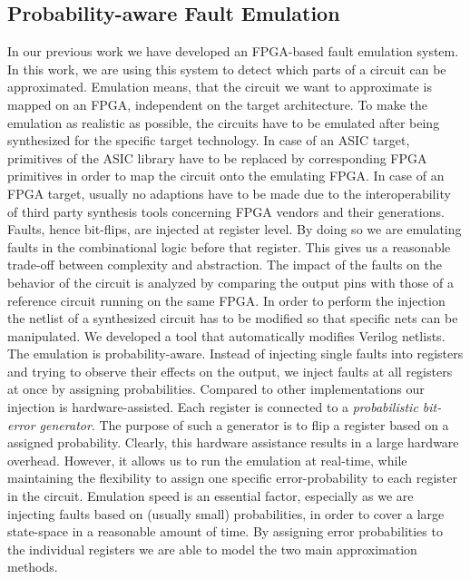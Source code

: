 \documentclass[conference]{IEEEtran}
\begin{document}
\subsection{Probability-aware Fault Emulation}
In our previous work we have developed an FPGA-based fault emulation system. In this work, we are using this system to detect which parts of a circuit can be approximated. Emulation means, that the circuit we want to approximate is mapped on an FPGA, independent on the target architecture. To make the emulation as realistic as possible, the circuits have to be emulated after being synthesized for the specific target technology. In case of an ASIC target, primitives of the ASIC library have to be replaced by corresponding FPGA primitives in order to map the circuit onto the emulating FPGA. In case of an FPGA target, usually no adaptions have to be made due to the interoperability of third party synthesis tools concerning FPGA vendors and their generations. Faults, hence bit-flips, are injected at register level. By doing so we are emulating faults in the combinational logic before that register. This gives us a reasonable trade-off between complexity and abstraction. The impact of the faults on the behavior of the circuit is analyzed by comparing the output pins with those of a reference circuit running on the same FPGA. In order to perform the injection the netlist of a synthesized circuit has to be modified so that specific nets can be manipulated. We developed a tool that automatically modifies Verilog netlists. The emulation is probability-aware. Instead of injecting single faults into registers and trying to observe their effects on the output, we inject faults at all registers at once by assigning probabilities. Compared to other implementations our injection is hardware-assisted. Each register is connected to a \emph{probabilistic bit-error generator}. The purpose of such a generator is to flip a register based on a assigned probability. Clearly, this hardware assistance results in a large hardware overhead. However, it allows us to run the emulation at real-time, while maintaining the flexibility to assign one specific error-probability to each register in the circuit. Emulation speed is an essential factor, especially as we are injecting faults based on (usually small) probabilities, in order to cover a large state-space in a reasonable amount of time. By assigning error probabilities to the individual registers we are able to model the two main approximation methods.
\end{document}
